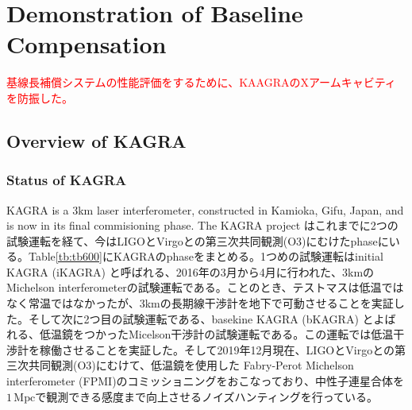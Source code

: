 \chapter{Demonstration of Baseline Compensation}
\textcolor{red}{基線長補償システムの性能評価をするために、KAAGRAのXアームキャビティを防振した。}

\section{Overview of KAGRA}
\subsection{Status of KAGRA}
KAGRA is a 3km laser interferometer, constructed in Kamioka, Gifu, Japan, and is now in its final commisioning phase. The KAGRA project はこれまでに2つの試験運転を経て、今はLIGOとVirgoとの第三次共同観測(O3)にむけたphaseにいる。Table\ref{tb:tb600}にKAGRAのphaseをまとめる。1つめの試験運転はinitial KAGRA (iKAGRA) と呼ばれる、2016年の3月から4月に行われた、3kmのMichelson interferometerの試験運転である。ことのとき、テストマスは低温ではなく常温ではなかったが、3kmの長期線干渉計を地下で可動させることを実証した。そして次に2つ目の試験運転である、basekine KAGRA (bKAGRA) とよばれる、低温鏡をつかったMicelson干渉計の試験運転である。この運転では低温干渉計を稼働させることを実証した。そして2019年12月現在、LIGOとVirgoとの第三次共同観測(O3)にむけて、低温鏡を使用した Fabry-Perot Michelson interferometer (FPMI)のコミッショニングをおこなっており、中性子連星合体を$1\,\mathrm{Mpc}$で観測できる感度まで向上させるノイズハンティングを行っている。

